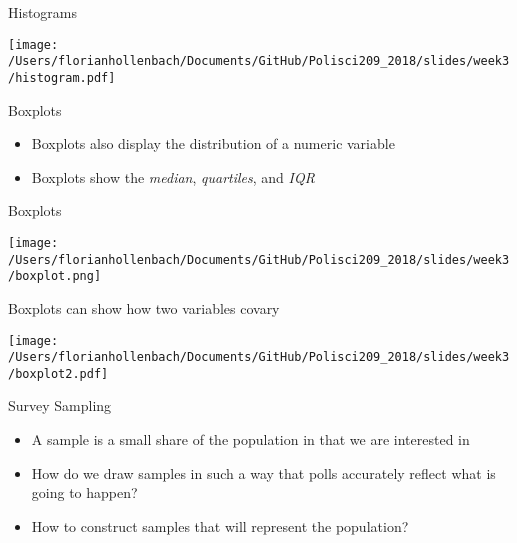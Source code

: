 \documentclass[presentation]{beamer}
\begin{document}
\begin{frame}[label={sec:org6019939}]{Histograms}
\begin{center}
\texttt{[image: /Users/florianhollenbach/Documents/GitHub/Polisci209\_2018/slides/week3/histogram.pdf]}
\end{center}
\end{frame}


\begin{frame}[label={sec:org638494d}]{Boxplots}
\begin{itemize}
\item Boxplots also display the distribution of a numeric variable
\item Boxplots show the \emph{median}, \emph{quartiles}, and \emph{IQR}
\end{itemize}
\end{frame}

\begin{frame}[label={sec:orgf73f02c}]{Boxplots}
\begin{center}
\texttt{[image: /Users/florianhollenbach/Documents/GitHub/Polisci209\_2018/slides/week3/boxplot.png]}
\end{center}
\end{frame}


\begin{frame}[label={sec:orge9cc12b}]{Boxplots can show how two variables covary}
\begin{center}
\texttt{[image: /Users/florianhollenbach/Documents/GitHub/Polisci209\_2018/slides/week3/boxplot2.pdf]}
\end{center}
\end{frame}

\begin{frame}[label={sec:orgb6a874d}]{Survey Sampling}
\begin{itemize}
\item A sample is a small share of the population in that we are interested in
\end{itemize}

\pause

\begin{itemize}
\item How do we draw samples in such a way that polls accurately reflect what is going to happen?

\item How to construct samples that will represent the population?
\end{itemize}
\end{frame}
\end{document}
